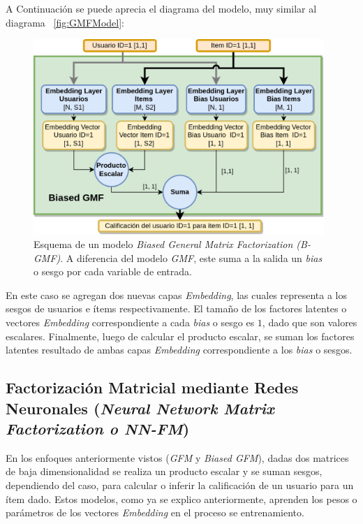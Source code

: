 \documentclass[11pt,a4paper,twoside]{thesis}
\begin{document}
A Continuación se puede aprecia el diagrama del modelo, muy similar al diagrama
~\ref{fig:GMFModel}:

\begin{figure}[h!]
	\centering
	\includegraphics[width=11cm]{./images/Biased-GMF.png}
	\caption{
		Esquema de un modelo \textit{Biased General Matrix Factorization (B-GMF)}.
		A diferencia del modelo \textit{GMF}, este suma a la salida un \textit{bias}
		o sesgo por cada variable de entrada.
	}
	\label{fig:BiasedGMFModel}
\end{figure}

En este caso se agregan dos nuevas capas \textit{Embedding}, las cuales
representa a los sesgos de usuarios e ítems respectivamente. El tamaño de los
factores latentes o vectores \textit{Embedding} correspondiente a cada
\textit{bias} o sesgo es $1$, dado que son valores escalares. Finalmente, luego
de calcular el producto escalar, se suman los factores latentes resultado de
ambas capas \textit{Embedding} correspondiente a los \textit{bias} o sesgos.

\clearpage

\subsection{Factorización Matricial mediante Redes Neuronales
	(\textit{Neural Network Matrix Factorization o NN-FM})}

En los enfoques anteriormente vistos (\textit{GFM} y \textit{Biased GFM}),
dadas dos matrices de baja dimensionalidad se realiza un producto escalar y se
suman sesgos, dependiendo del caso, para calcular o inferir la calificación de
un usuario para un ítem dado. Estos modelos, como ya se explico anteriormente,
aprenden los pesos o parámetros de los vectores \textit{Embedding} en el
proceso se entrenamiento.
\end{document}

